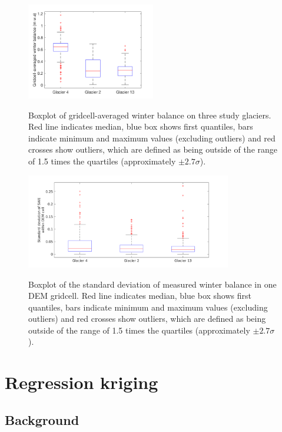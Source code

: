 \documentclass[onecolumn, letterpaper]{igs}
\newcommand{\boxMatlab}{Red line indicates median, blue box shows first quantiles, bars indicate minimum and maximum values (excluding outliers) and red crosses show outliers, which are defined as being outside of the range of 1.5 times the quartiles (approximately $\pm2.7\sigma$). }
\renewcommand{\thefigure}{S\arabic{figure}}
\begin{document}
\renewcommand{\thefigure}{S\arabic{figure}}
\addtocounter{figure}{+1}

\begin{figure}[h!]
\centering
	\includegraphics[width =0.5\textwidth]{GridcellWB_boxplot.png}\\
	\caption{Boxplot of gridcell-averaged winter balance on three study glaciers. \boxMatlab}
	\label{fig:GridcellWB_boxplot}
\end{figure}

\begin{figure}[h!]
\centering
	\includegraphics[width = 0.8\textwidth]{DEMcellSTD.png}\\
	\caption[]{Boxplot of the standard deviation of measured winter balance in one DEM gridcell. \boxMatlab}
	\label{fig:DEMcellSTD}
\end{figure}



\section{Regression kriging}
\label{sec:regressionkriging}

\subsection{Background}
\end{document}
